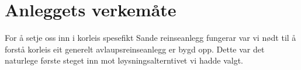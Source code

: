 \chapter{Anleggets verkemåte}
\thispagestyle{fancy}

For å setje oss inn i korleis spesefikt Sande reinseanlegg fungerar var vi nødt til å forstå
korleis eit generelt avlaupsreinseanlegg er bygd opp. Dette var det naturlege første
steget inn mot løysningsalterntivet vi hadde valgt. 


